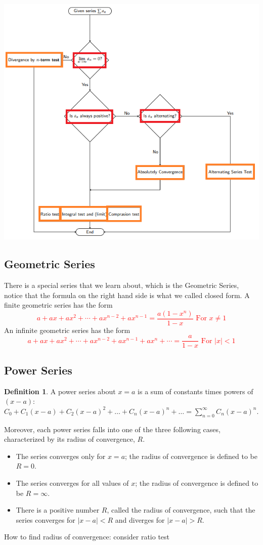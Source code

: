 \documentclass[12pt]{article}
\theoremstyle{definition}
\theoremstyle{definition}
\newtheorem{definition}{Definition}[section]
\theoremstyle{remark}
\theoremstyle{definition}
\theoremstyle{definition}
\theoremstyle{definition}
\begin{document}
\includegraphics[width=1\textwidth]{program.png}


\subsection{Geometric Series}
There is a special series that we learn about, which is the Geometric Series, notice that the formula on the right hand side is what we called closed form. 
A finite geometric series has the form
\textcolor{red}{\[a + ax + ax^2 + \cdots + ax^{n−2} + ax^{n−1}=\frac{a(1-x^n)}{1-x}\text{ For } x \neq 1\]}
An infinite geometric series has the form
\textcolor{red}{\[a + ax + ax^2 + \cdots + ax^{n−2} + ax^{n−1}+ax^n +\cdots=\frac{a}{1-x}\text{ For } |x| < 1\]}

\newpage

\subsection{Power Series}
\begin{definition}
	A power series about $x = a$ is a sum of constants times powers of $(x - a)$: \\
	$C_0 + C_1(x - a) + C_2(x - a)^2 + \ldots + C_n(x - a)^n + \ldots =	\sum_{n
	=0}^{\infty}	C_n(x - a)^n$.
\end{definition}
Moreover, each power series falls into one of the three following cases, characterized by its radius of convergence, $R$.
\begin{itemize}
\item The series converges only for $x = a$; the radius of convergence is defined to be $R = 0$.
\item The series converges for all values of $x$; the radius of convergence is defined to be
$R = \infty$.
\item There is a positive number $R$, called the radius of convergence, such that the series
converges for $|x - a| < R$ and diverges for $|x - a| > R$. 
\end{itemize}
How to find radius of convergence: consider ratio test
\end{document}
